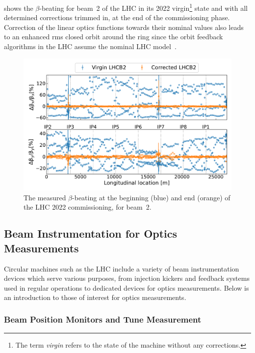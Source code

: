  shows the \(\beta\)-beating for beam~\num{2} of the LHC in its \num{2022} virgin\footnote{The term \textit{virgin} refers to the state of the machine without any corrections.} state and with all determined corrections trimmed in, at the end of the commissioning phase.
Correction of the linear optics functions towards their nominal values also leads to an enhanced rms closed orbit around the ring since the orbit feedback algorithms in the LHC assume the nominal LHC model~\cite{PRAB:Tomas:Record_Low_Beta_Beating_in_the_LHC, PRAB:Persson:LHC_Optics_Commissioning_OnePercent}.

\begin{figure}[!hbt]
  \centering
  \includegraphics*[width=0.9\linewidth]{Figures/Optics_Measurements_Corrections_at_LHC/virgin_vs_commissionned_lhcb2.pdf}
  \caption{The measured \(\beta\)-beating at the beginning (\textcolor{mplblue}{blue}) and end (\textcolor{mplorange}{orange}) of the LHC \num{2022} commissioning, for beam~\num{2}.}
  \label{figure:virgin_vs_corrected_lhcb2}
\end{figure}

\subsection{Beam Instrumentation for Optics Measurements}
\label{subsection:beam_instrumentation_for_optics_measurements}

Circular machines such as the LHC include a variety of beam instrumentation devices which serve various purposes, from injection kickers and feedback systems used in regular operations to dedicated devices for optics measurements.
Below is an introduction to those of interest for optics measurements.

\subsubsection*{Beam Position Monitors and Tune Measurement}

